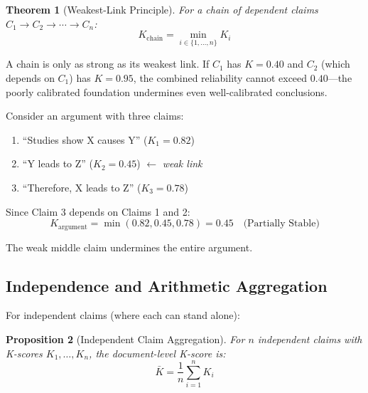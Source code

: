 \documentclass[11pt,a4paper]{article}
\newtheorem{theorem}{Theorem}[section]
\newtheorem{proposition}[theorem]{Proposition}
\theoremstyle{remark}
\begin{document}
\begin{theorem}[Weakest-Link Principle]
\label{thm:wla}
For a chain of dependent claims $C_1 \to C_2 \to \cdots \to C_n$:
\begin{equation}
K_{\text{chain}} = \min_{i \in \{1, \ldots, n\}} K_i
\end{equation}
\end{theorem}

\begin{proofbox}
A chain is only as strong as its weakest link. If $C_1$ has $K = 0.40$ and $C_2$ (which depends on $C_1$) has $K = 0.95$, the combined reliability cannot exceed $0.40$---the poorly calibrated foundation undermines even well-calibrated conclusions.
\end{proofbox}

\begin{examplebox}[title={Weakest-Link Aggregation}]
Consider an argument with three claims:
\begin{enumerate}
    \item ``Studies show X causes Y'' ($K_1 = 0.82$)
    \item ``Y leads to Z'' ($K_2 = 0.45$) $\leftarrow$ \textit{weak link}
    \item ``Therefore, X leads to Z'' ($K_3 = 0.78$)
\end{enumerate}

Since Claim 3 depends on Claims 1 and 2:
\begin{equation}
K_{\text{argument}} = \min(0.82, 0.45, 0.78) = 0.45 \quad \text{(Partially Stable)}
\end{equation}

The weak middle claim undermines the entire argument.
\end{examplebox}

\subsection{Independence and Arithmetic Aggregation}

For independent claims (where each can stand alone):

\begin{proposition}[Independent Claim Aggregation]
\label{prop:independent}
For $n$ independent claims with K-scores $K_1, \ldots, K_n$, the document-level K-score is:
\begin{equation}
\bar{K} = \frac{1}{n} \sum_{i=1}^{n} K_i
\end{equation}
\end{proposition}
\end{document}
